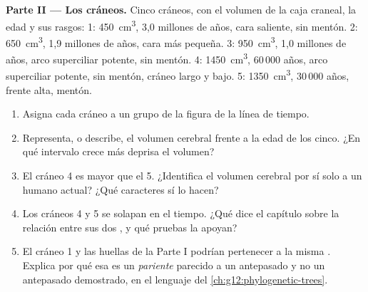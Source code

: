 \begin{problem}
\medskip
\noindent\textbf{Parte II --- Los cráneos.}
Cinco cráneos, con el volumen de la caja craneal, la edad y sus
rasgos: 1: \qty{450}{cm^3}, 3,0 millones de años, cara saliente, sin
mentón. 2: \qty{650}{cm^3}, 1,9 millones de años, cara más pequeña.
3: \qty{950}{cm^3}, 1,0 millones de años, arco superciliar potente, sin
mentón. 4: \qty{1450}{cm^3}, 60\,000 años, arco superciliar potente,
sin mentón, cráneo largo y bajo. 5: \qty{1350}{cm^3}, 30\,000 años,
frente alta, mentón.
\begin{enumerate}[resume]
  \item Asigna cada cráneo a un grupo de la figura de la línea de
        tiempo.
  \item Representa, o describe, el volumen cerebral frente a la edad de
        los cinco. ¿En qué intervalo crece más deprisa el volumen?
  \item El cráneo 4 es mayor que el 5. ¿Identifica el volumen cerebral
        por sí solo a un humano actual? ¿Qué caracteres sí lo hacen?
  \item Los cráneos 4 y 5 se solapan en el tiempo. ¿Qué dice el
        capítulo sobre la relación entre sus dos , y qué
        pruebas la apoyan?
  \item El cráneo 1 y las huellas de la Parte I podrían pertenecer a la
        misma . Explica por qué esa  es un
        \emph{pariente} parecido a un antepasado y no un antepasado
        demostrado, en el lenguaje del \cref{ch:g12:phylogenetic-trees}.
\end{enumerate}


\end{problem}
